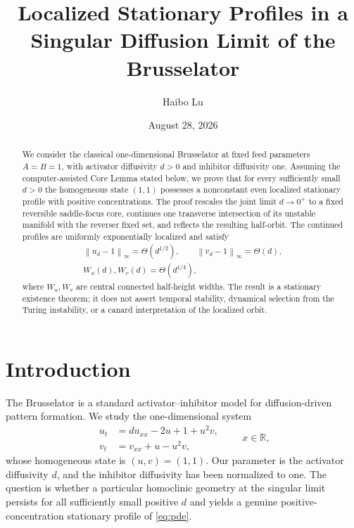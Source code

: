 \documentclass[11pt,reqno]{amsart}
\title[Localized Brusselator profiles]{Localized Stationary Profiles in a Singular Diffusion Limit of the Brusselator}
\author{Haibo Lu}
\date{August 28, 2026}
\numberwithin{equation}{section}
\theoremstyle{remark}
\newcommand{\R}{\mathbb R}
\newcommand{\norm}[1]{\left\lVert #1\right\rVert}
\begin{document}
\begin{abstract}
We consider the classical one-dimensional Brusselator at fixed feed parameters
$A=B=1$, with activator diffusivity $d>0$ and inhibitor diffusivity one.
Assuming the computer-assisted Core Lemma stated below, we prove that for every
sufficiently small $d>0$ the homogeneous state $(1,1)$ possesses a nonconstant
even localized stationary profile with positive concentrations.  The proof
rescales the joint limit $d\to0^+$ to a fixed reversible saddle-focus core,
continues one transverse intersection of its unstable manifold with the
reverser fixed set, and reflects the resulting half-orbit.  The continued
profiles are uniformly exponentially localized and satisfy
\[
 \begin{gathered}
 \norm{u_d-1}_{\infty}=\Theta(d^{1/2}),\qquad
 \norm{v_d-1}_{\infty}=\Theta(d),\\
 W_u(d),W_v(d)=\Theta(d^{1/4}),
 \end{gathered}
\]
where $W_u,W_v$ are central connected half-height widths.  The result is a
stationary existence theorem; it does not assert temporal stability, dynamical
selection from the Turing instability, or a canard interpretation of the
localized orbit.
\end{abstract}

\maketitle

\section{Introduction}

The Brusselator is a standard activator--inhibitor model for diffusion-driven
pattern formation.  We study the one-dimensional system
\begin{equation}\label{eq:pde}
 \begin{aligned}
 u_t&=d u_{xx}-2u+1+u^2v,\\
 v_t&=v_{xx}+u-u^2v,
 \end{aligned}
 \qquad x\in\R,
\end{equation}
whose homogeneous state is $(u,v)=(1,1)$.  Our parameter is the activator
diffusivity $d$, and the inhibitor diffusivity has been normalized to one.
The question is whether a particular homoclinic geometry at the singular
limit persists for all sufficiently small positive $d$ and yields a genuine
positive-concentration stationary profile of \eqref{eq:pde}.
\end{document}

